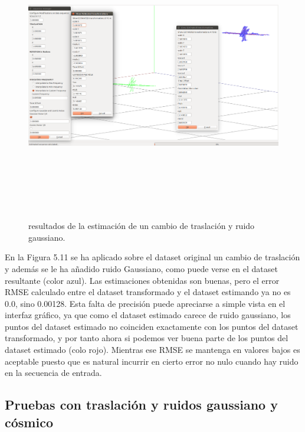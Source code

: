 \begin{figure}[h]
\begin{center}
\label{fig:opciones de View}\includegraphics[height=12.0cm,width=18.0cm]{img/cap6/Trasla_GaussNoise_abba.png}
\hspace{0.5cm}

\end{center}

\caption{ resultados de la estimación de un cambio de traslación y ruido gaussiano.}
\end{figure}
En la Figura 5.11 se ha aplicado sobre el dataset original un cambio de traslación y además se le ha añadido ruido Gaussiano, como puede verse en el dataset resultante (color azul). Las estimaciones obtenidas son buenas, pero el error RMSE calculado entre el dataset transformado y el dataset estimando ya no es 0.0, sino 0.00128. Esta falta de precisión puede apreciarse a simple vista en el interfaz gráfico, ya que como el dataset estimado carece de ruido gaussiano, los puntos del dataset estimado no coinciden exactamente con los puntos del dataset transformado, y por tanto ahora si podemos ver buena parte de los puntos del dataset estimado (colo rojo).
Mientras ese RMSE se mantenga en valores bajos es aceptable puesto que es natural incurrir en cierto error no nulo cuando hay ruido en la secuencia de entrada.

\subsection{Pruebas con traslación y ruidos gaussiano y cósmico}

